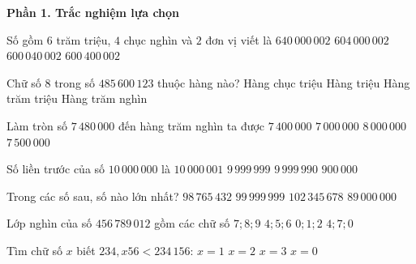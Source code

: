 \textbf{Phần 1. Trắc nghiệm lựa chọn}

\begin{ex} %
Số gồm $6$ trăm triệu, $4$ chục nghìn và $2$ đơn vị viết là
\choice
{$640\,000\,002$}
{$604\,000\,002$}
{\True $600\,040\,002$}
{$600\,400\,002$}
\end{ex}

\begin{ex} %
Chữ số 8 trong số $485\,600\,123$ thuộc hàng nào?
\choice
{\True Hàng chục triệu}
{Hàng triệu}
{Hàng trăm triệu}
{Hàng trăm nghìn}
\end{ex}

\begin{ex} %
Làm tròn số $7\,480\,000$ đến hàng trăm nghìn ta được
\choice
{$7\,400\,000$}
{$7\,000\,000$}
{$8\,000\,000$}
{\True $7\,500\,000$}
\end{ex}

\begin{ex} %
Số liền trước của số $10\,000\,000$ là
\choice
{$10\,000\,001$}
{\True $9\,999\,999$}
{$9\,999\,990$}
{$900\,000$}
\end{ex}

\begin{ex} %
Trong các số sau, số nào lớn nhất?
\choice
{$98\,765\,432$}
{$99\,999\,999$}
{\True $102\,345\,678$}
{$89\,000\,000$}
\end{ex}

\begin{ex} %
Lớp nghìn của số $456\,789\,012$ gồm các chữ số
\choice
{\True $7; 8; 9$}
{$4; 5; 6$}
{$0; 1; 2$}
{$4; 7; 0$}
\end{ex}

\begin{ex} %
Tìm chữ số $x$ biết $234,x56 < 234\,156$:
\choice
{$x = 1$}
{$x = 2$}
{$x = 3$}
{\True $x = 0$}
\end{ex}


